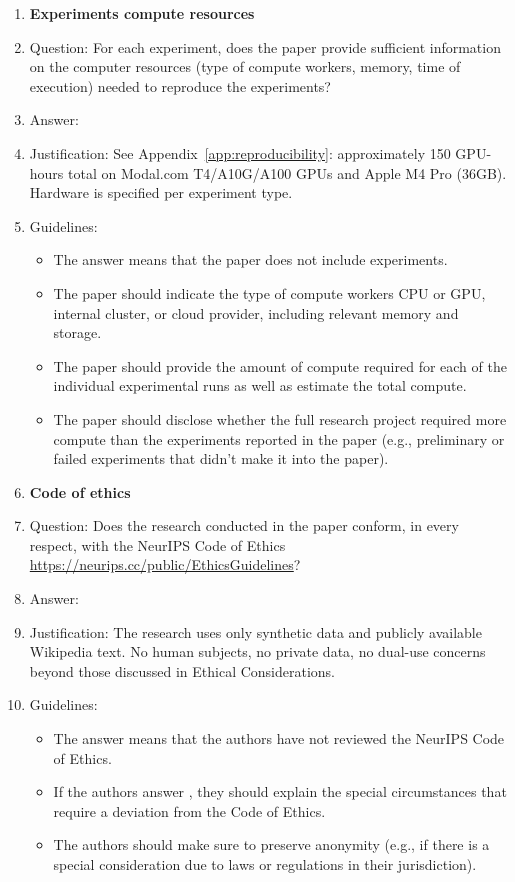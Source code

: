 \documentclass{article}
\begin{document}
\begin{enumerate}
\item {\bf Experiments compute resources}
    \item[] Question: For each experiment, does the paper provide sufficient information on the computer resources (type of compute workers, memory, time of execution) needed to reproduce the experiments?
    \item[] Answer: \answerYes{}
    \item[] Justification: See Appendix~\ref{app:reproducibility}: approximately 150 GPU-hours total on Modal.com T4/A10G/A100 GPUs and Apple M4 Pro (36GB). Hardware is specified per experiment type.
    \item[] Guidelines:
    \begin{itemize}
        \item The answer \answerNA{} means that the paper does not include experiments.
        \item The paper should indicate the type of compute workers CPU or GPU, internal cluster, or cloud provider, including relevant memory and storage.
        \item The paper should provide the amount of compute required for each of the individual experimental runs as well as estimate the total compute.
        \item The paper should disclose whether the full research project required more compute than the experiments reported in the paper (e.g., preliminary or failed experiments that didn't make it into the paper).
    \end{itemize}

\item {\bf Code of ethics}
    \item[] Question: Does the research conducted in the paper conform, in every respect, with the NeurIPS Code of Ethics \url{https://neurips.cc/public/EthicsGuidelines}?
    \item[] Answer: \answerYes{}
    \item[] Justification: The research uses only synthetic data and publicly available Wikipedia text. No human subjects, no private data, no dual-use concerns beyond those discussed in Ethical Considerations.
    \item[] Guidelines:
    \begin{itemize}
        \item The answer \answerNA{} means that the authors have not reviewed the NeurIPS Code of Ethics.
        \item If the authors answer \answerNo, they should explain the special circumstances that require a deviation from the Code of Ethics.
        \item The authors should make sure to preserve anonymity (e.g., if there is a special consideration due to laws or regulations in their jurisdiction).
    \end{itemize}



\end{enumerate}
\end{document}
